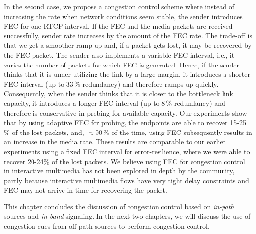 In the second case, we propose a congestion control scheme where instead of
increasing the rate when network conditions seem stable, the sender introduces
FEC for one RTCP interval. If the FEC and the media packets are received
successfully, sender rate increases by the amount of the FEC rate. 
The trade-off is that we get a smoother ramp-up and, if a packet gets
lost, it may be recovered by the FEC packet. The sender also implements a
variable FEC interval, i.e., it varies the number of packets for which FEC is
generated. Hence, if the sender thinks that it is under utilizing the link by a
large margin, it introduces a shorter FEC interval (up to 33\,\% redundancy)
and therefore ramps up quickly. Consequently, when the sender thinks that it is closer
to the bottleneck link capacity, it introduces a longer FEC interval (up to
8\,\% redundancy) and therefore is conservative in probing for available
capacity. Our experiments show that by using adaptive FEC for probing, the
endpoints are able to recover 15-25\,\% of the lost packets, and,
$\approx$90\,\% of the time, using FEC subsequently results in an increase in
the media rate. These results are comparable to our earlier experiments using
a fixed FEC interval for error-resilience, where we were able to recover
20-24\;\% of the lost packets. We believe using FEC for congestion control in
interactive multimedia has not been explored in depth by the community, partly
because interactive multimedia flows have very tight delay constraints and FEC
may not arrive in time for recovering the packet.

This chapter concludes the discussion of congestion control based on 
\emph{in-path} sources and \emph{in-band} signaling. In the next two chapters, we will
discuss the use of congestion cues from off-path sources to perform congestion
control.
